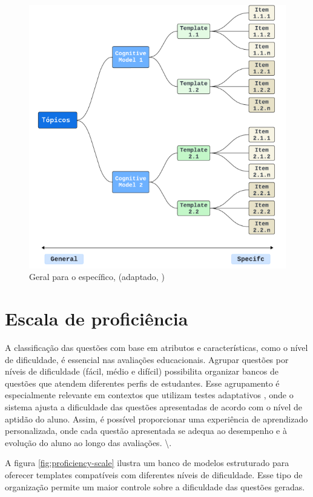 \begin{figure}[ht]
	\centering
	\includegraphics[width=14cm]{./imagens/capitulo5/geral-especifico-com-topicos}
	\caption{Geral para o específico, (adaptado, \cite{hendrickson2010}) }
	\label{fig:geral-to-specif}
\end{figure}


\section{Escala de proficiência}

A classificação das questões com base em atributos e características, como o nível de dificuldade, é essencial nas avaliações educacionais. Agrupar questões por níveis de dificuldade (fácil, médio e difícil) possibilita organizar bancos de questões que atendem diferentes perfis de estudantes.  Esse agrupamento é especialmente relevante em contextos que utilizam testes adaptativos , onde o sistema ajusta a dificuldade das questões apresentadas de acordo com o nível de aptidão do aluno. Assim, é possível proporcionar uma experiência de aprendizado personalizada, onde cada questão apresentada se adequa ao desempenho e à evolução do aluno ao longo das avaliações. \textbackslash{}\parencite{pasquali2018}. 


A figura \ref{fig:proficiency-scale}  ilustra um banco de modelos estruturado para oferecer templates compatíveis com diferentes níveis de dificuldade. Esse tipo de organização permite um maior controle sobre a dificuldade das questões geradas.


